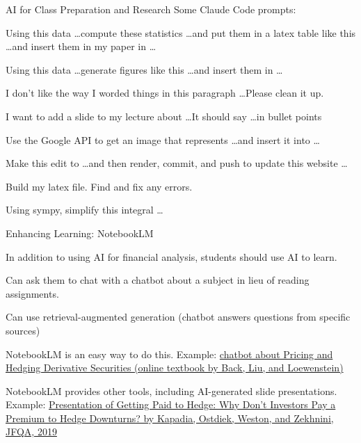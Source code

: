 \documentclass[aspectratio=169]{beamer}
\begin{document}
\begin{frame}{AI for Class Preparation and Research}
Some Claude Code prompts:

\begin{baritemize}
\item Using this data \ldots compute these statistics \ldots and put them in a latex table like this \ldots and insert them in my paper in \ldots
\item Using this data \ldots generate figures like this \ldots and insert them in \ldots
\item I don't like the way I worded things in this paragraph \ldots Please clean it up.
\item I want to add a slide to my lecture about \ldots It should say \ldots in bullet points
\item Use the Google API to get an image that represents \ldots and insert it into  \ldots
\item Make this edit to \ldots and then render, commit, and push to update this website \ldots
\item Build my latex file.  Find and fix any errors.
\item Using sympy, simplify this integral \ldots
\end{baritemize}
\end{frame}

\begin{frame}{Enhancing Learning: NotebookLM}
\begin{baritemize}
\item In addition to using AI for financial analysis, students should use AI to learn.
\item Can ask them to chat with a chatbot about a subject in lieu of reading assignments.
\item Can use retrieval-augmented generation (chatbot answers questions from specific sources)
\item NotebookLM is an easy way to do this.  Example:  \href{https://notebooklm.google.com/notebook/701244f5-4833-4217-875d-96380578825b}{chatbot about Pricing and Hedging Derivative Securities (online textbook by Back, Liu, and Loewenstein)}
\item NotebookLM provides other tools, including AI-generated slide presentations.  Example: \href{https://mgmt638.kerryback.com/videos/Kapadia_Ostdiek_Weston_Zekhnini_JFQA_2019.mp4}{Presentation of Getting Paid to Hedge: Why Don't Investors Pay
a Premium to Hedge Downturns? by Kapadia, Ostdiek, Weston, and Zekhnini, JFQA, 2019}
\end{baritemize}
\end{frame}
\end{document}
